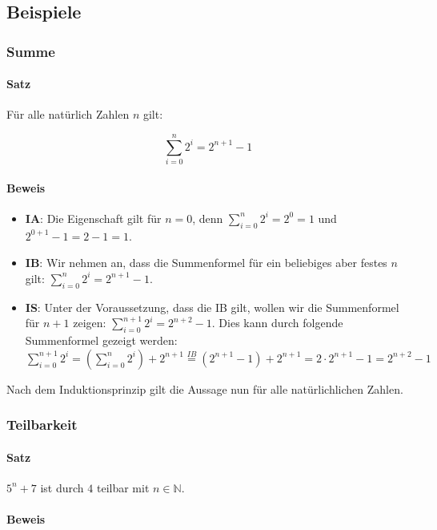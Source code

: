 \documentclass[10pt,a4paper,twoside,twocolumn]{article}
\begin{document}
	\subsection{Beispiele}
	
	\subsubsection{Summe}
	
	\paragraph{Satz} Für alle natürlich Zahlen $ n $ gilt: 
	
	\[ \sum_{i=0}^{n} 2^i = 2^{n + 1} - 1 \]
	
	\paragraph{Beweis}
	
	\begin{itemize}
		\setlength\itemsep{0em}
		\item \textbf{IA}: Die Eigenschaft gilt für $ n = 0 $, denn $ \sum_{i=0}^{n} 2^i = 2^0 = 1 $ und $ 2^{0+1} - 1 = 2 - 1 = 1 $.
		\item \textbf{IB}: Wir nehmen an, dass die Summenformel für ein beliebiges aber festes $ n $ gilt: $ \sum_{i=0}^{n} 2^i = 2^{n + 1} - 1 $.
		\item \textbf{IS}: Unter der Voraussetzung, dass die IB gilt, wollen wir die Summenformel für $ n + 1 $ zeigen: $ \sum_{i=0}^{n + 1} 2^i = 2^{n + 2} - 1 $. Dies kann durch folgende Summenformel gezeigt werden:
		$ \sum_{i=0}^{n + 1} 2^i = (\sum_{i=0}^{n} 2^i) + 2^{n + 1} \stackrel{IB}{=} (2^{n + 1} - 1) + 2^{n + 1} = 2 \cdot 2^{n + 1} - 1 = 2^{n + 2}- 1 $
	\end{itemize}

	Nach dem Induktionsprinzip gilt die Aussage nun für alle natürlichlichen Zahlen.
	
	\subsubsection{Teilbarkeit}
	
	\paragraph{Satz} $ 5^n + 7 $ ist durch $ 4 $ teilbar mit $ n \in \mathbb{N} $.
	
	\paragraph{Beweis}
	
\end{document}

